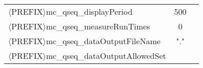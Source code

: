 \begin{table}[htpb]
\begin{center}
\begin{tabular}{l c  m{6cm}}
$\langle$PREFIX$\rangle$mc\_qseq\_displayPeriod          &  500    &             \\ %
$\langle$PREFIX$\rangle$mc\_qseq\_measureRunTimes        &    0    &             \\ %
$\langle$PREFIX$\rangle$mc\_qseq\_dataOutputFileName     &   "."   &             \\ %
$\langle$PREFIX$\rangle$mc\_qseq\_dataOutputAllowedSet   &         &             \\ %
\bottomrule
\end{tabular}
\end{center}
\end{table}
% 
% 
% 
